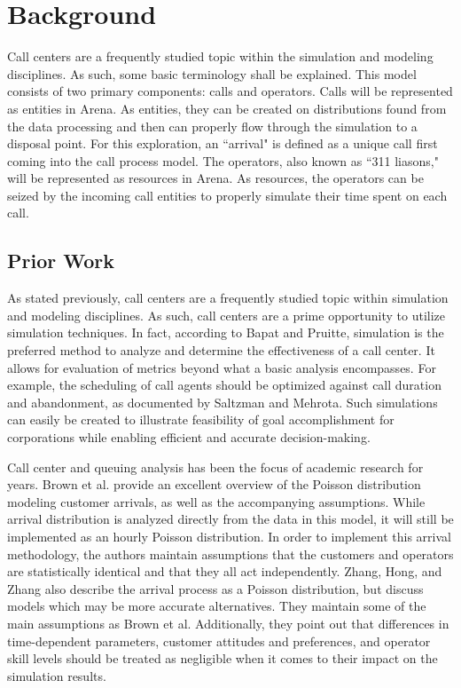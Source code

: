 \documentclass[12pt,twocolumn]{article}
\begin{document}
\section{Background}
Call centers are a frequently studied topic within the simulation and modeling disciplines.  As such, some basic terminology shall be explained.  This model consists of two primary components:  calls and operators.  Calls will be represented as entities in Arena.  As entities, they can be created on distributions found from the data processing and then can properly flow through the simulation to a disposal point.  For this exploration, an ``arrival" is defined as a unique call first coming into the call process model.  The operators, also known as ``311 liasons," will be represented as resources in Arena.  As resources, the operators can be seized by the incoming call entities to properly simulate their time spent on each call.

	\subsection{Prior Work}

As stated previously, call centers are a frequently studied topic within simulation and modeling disciplines.  As such, call centers are a prime opportunity to utilize simulation techniques.  In fact, according to Bapat and Pruitte, simulation is the preferred method to analyze and determine the effectiveness of a call center.\cite{bapat}  It allows for evaluation of metrics beyond what a basic analysis encompasses.  For example, the scheduling of call agents should be optimized against call duration and abandonment, as documented by Saltzman and Mehrota\cite{saltzman}.  Such simulations can easily be created to illustrate feasibility of goal accomplishment for corporations while enabling efficient and accurate decision-making\cite{saltzmeh}.

\par


Call center and queuing analysis has been the focus of academic research for years.  Brown et al. provide an excellent overview of the Poisson distribution modeling customer arrivals, as well as the accompanying assumptions\cite{brown}.  While arrival distribution is analyzed directly from the data in this model, it will still be implemented as an hourly Poisson distribution. In order to implement this arrival methodology, the authors maintain assumptions that the customers and operators are statistically identical and that they all act independently.  Zhang, Hong, and Zhang also describe the arrival process as a Poisson distribution, but discuss models which may be more accurate alternatives\cite{zhang}.  They maintain some of the main assumptions as Brown et al.  Additionally, they point out that differences in time-dependent parameters, customer attitudes and preferences, and operator skill levels should be treated as negligible when it comes to their impact on the simulation results.
\end{document}
